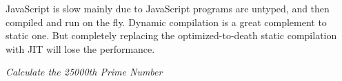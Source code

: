 \documentclass[conference]{IEEEtran}
\begin{document}
%
%

%

JavaScript is slow mainly due to JavaScript programs are untyped, and then compiled and run on the fly. Dynamic compilation is a great complement to static one. But completely replacing the optimized-to-death static compilation with JIT will lose the performance. 
%
%


\begin{algorithm}[hbt!]
	\caption{\scriptsize{\emph{Calculate the 25000th Prime Number}}}
	 \label{algorithm:prime}
	 \begin{algorithmic}[1]
			        \ENDIF
			    \ENDFOR
			        \ENDIF
			     \ENDIF
			  \ENDFOR
	\end{algorithmic}
\end{algorithm}

\end{document}
